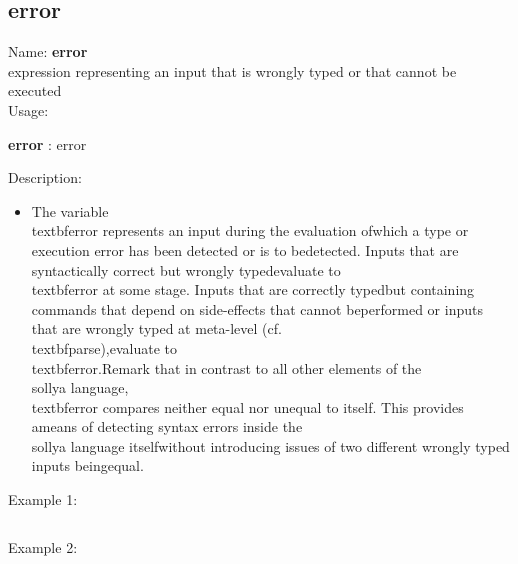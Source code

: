 \subsection{error}
\label{laberror}
\noindent Name: \textbf{error}\\
expression representing an input that is wrongly typed or that cannot be executed\\
\noindent Usage: 
\begin{center}
\textbf{error} : \textsf{error}\\
\end{center}
\noindent Description: \begin{itemize}

\item The variable \\textbf{error} represents an input during the evaluation of\n   which a type or execution error has been detected or is to be\n   detected. Inputs that are syntactically correct but wrongly typed\n   evaluate to \\textbf{error} at some stage.  Inputs that are correctly typed\n   but containing commands that depend on side-effects that cannot be\n   performed or inputs that are wrongly typed at meta-level (cf. \\textbf{parse}),\n   evaluate to \\textbf{error}.\n    \n   Remark that in contrast to all other elements of the \\sollya language,\n   \\textbf{error} compares neither equal nor unequal to itself. This provides a\n   means of detecting syntax errors inside the \\sollya language itself\n   without introducing issues of two different wrongly typed inputs being\n   equal.\n\end{itemize}
\noindent Example 1: 
\begin{center}\begin{minipage}{15cm}\begin{Verbatim}[frame=single]
\end{Verbatim}
\end{minipage}\end{center}
\noindent Example 2: 
\begin{center}\begin{minipage}{15cm}\begin{Verbatim}[frame=single]
\end{Verbatim}
\end{minipage}\end{center}

